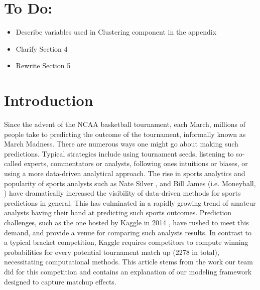 \documentclass[letterpaper,12pt]{article}
\begin{document}
\section*{To Do:}
\begin{itemize}
\item Describe variables used in Clustering component in the appendix
\item Clarify Section 4
\item Rewrite Section 5
\end{itemize}
\newpage

\section{Introduction}
Since the advent of the NCAA basketball tournament, each March, millions of people take to predicting the outcome of the tournament, informally known as March Madness. There are numerous ways one might go about making such predictions. Typical strategies include using tournament seeds, listening to so-called experts, commentators or analysts, following ones intuitions or biases, or using a more data-driven analytical approach. 
The rise in sports analytics and  popularity of sports analysts such as Nate Silver \citep{silver}, and Bill James (i.e. Moneyball, \citep{james, moneyball}) have dramatically increased the visibility of data-driven methods for sports predictions in general. This has culminated in a rapidly growing trend of amateur analysts having their hand at predicting such sports outcomes. 
Prediction challenges, such as the one hosted by Kaggle in 2014 \citep{kaggle}, have rushed to meet this demand, and provide a venue for comparing such analysts results. 
In contrast to a typical bracket competition, Kaggle requires competitors to compute winning probabilities for every potential tournament match up (2278 in total), necessitating computational methods. This article stems from the work our team did for this competition and contains an explanation of our modeling framework designed to capture matchup effects. 
\end{document}
